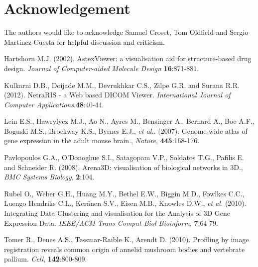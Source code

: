 \documentclass{bioinfo}
\begin{document}
\section*{Acknowledgement}
The authors would like to acknowledge Samuel Croset, Tom Oldfield and Sergio Martinez Cuesta for helpful discussion and criticism.

%
%
%
%
%

%

%

\begin{thebibliography}{}

 Hartshorn M.J. (2002). AstexViewer: a visualisation aid for structure-based drug design. {\it{Journal of Computer-aided Molecule Design}} {\bf{16}}:871-881.

 Kulkarni D.B., Doijade M.M., Devrukhkar C.S., Zilpe G.R. and Surana R.R. (2012). NetraRIS - a Web based DICOM Viewer. {\it{International Journal of Computer Applications}}.{\bf{48}}:40-44.

 Lein E.S., Hawrylycz M.J., Ao N., Ayres M., Bensinger A., Bernard A., Boe A.F., Boguski M.S., Brockway K.S., Byrnes E.J., {\it{et al.}}. (2007). Genome-wide atlas of gene expression in the adult mouse brain., {\it Nature}, {\bf{445}}:168-176.

 Pavlopoulos G.A., O'Donoghue S.I., Satagopam V.P., Soldatos T.G., Pafilis E. and Schneider R. (2008). Arena3D: visualisation of biological networks in 3D., {\it BMC Systems Biology}, {\bf{2}}:104.

 Rubel O., Weber G.H., Huang M.Y., Bethel E.W., Biggin M.D., Fowlkes C.C., Luengo Hendriks C.L., Ker\"{a}nen S.V., Eisen M.B., Knowles D.W., {\it{et al.}} (2010). Integrating Data Clustering and visualisation for the Analysis of 3D Gene Expression Data. {\it IEEE/ACM Trans Comput Biol Bioinform}, {\bf{7}}:64-79.

 Tomer R., Denes A.S., Tessmar-Raible K., Arendt D. (2010). Profiling by image registration reveals common origin of annelid mushroom bodies and vertebrate pallium. {\it{Cell}}, {\bf{142}}:800-809. 


\end{thebibliography}
\end{document}
